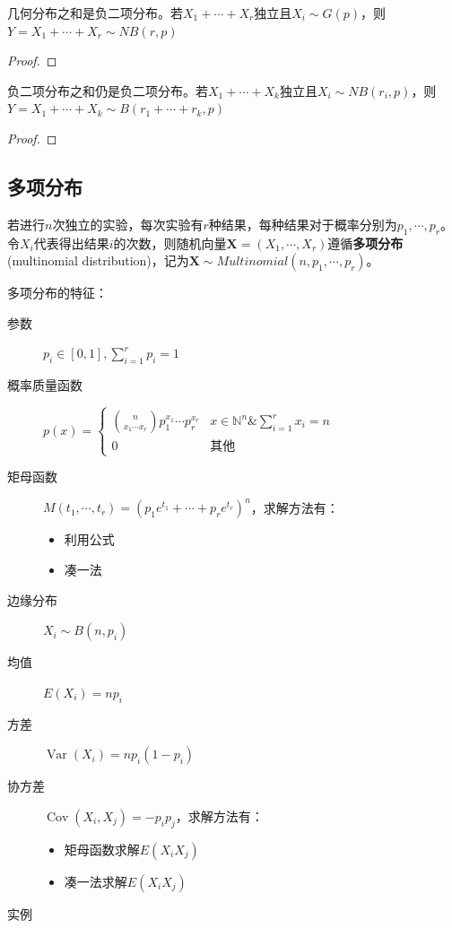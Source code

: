 \begin{proposition}\label{prop:sum_of_geo}
    几何分布之和是负二项分布。若$X_1+\cdots+X_r$独立且$X_i \sim G(p)$，则$Y=X_1+\cdots+X_r  \sim NB(r,p)$
\end{proposition}

\begin{proof}
\end{proof}

\begin{proposition}
    负二项分布之和仍是负二项分布。若$X_1+\cdots+X_k$独立且$X_i \sim NB(r_i,p)$，则$Y=X_1+\cdots+X_k  \sim B(r_1+\cdots+r_k,p )$
\end{proposition}

\begin{proof}
\end{proof}

\subsection{多项分布}

\begin{definition}[多项分布]
    若进行$n$次独立的实验，每次实验有$r$种结果，每种结果对于概率分别为$p_1,\cdots ,p_r$。令$X_i$代表得出结果$i$的次数，则随机向量$\mathbf{X}=(X_1,\cdots ,X_r)$遵循\textbf{多项分布}(multinomial distribution)，记为$\mathbf{X} \sim Multinomial(n,p_1,\cdots ,p_r)$。
\end{definition}

多项分布的特征：
\begin{description}
    \item[参数] $p_i \in [0,1], \sum_{i=1}^r p_i=1$
    \item[概率质量函数] $p(x)=\begin{cases}
                \binom{n}{x_1 \cdots x_r} p_1^{x_1}\cdots p_r^{x_r} & x \in \mathbb{N}^n \& \sum_{i=1}^r x_i=n \\
                0                                                   & \text{其他}
            \end{cases}$
    \item[矩母函数] $M(t_1,\cdots ,t_r)=(p_1 e^{t_1} +\cdots + p_r e^{t_r})^n$，求解方法有：
        \begin{itemize}
            \item 利用公式
            \item 凑一法
        \end{itemize}
    \item[边缘分布] $X_i \sim B(n,p_i)$
    \item[均值] $E(X_i)=np_i$
    \item[方差] $\operatorname{Var}(X_i)=np_i(1-p_i)$
    \item[协方差] $\operatorname{Cov}(X_i,X_j)=-p_i p_j$，求解方法有：
        \begin{itemize}
            \item 矩母函数求解$E(X_i X_j)$
            \item 凑一法求解$E(X_i X_j)$
        \end{itemize}
    \item[实例]
\end{description}

